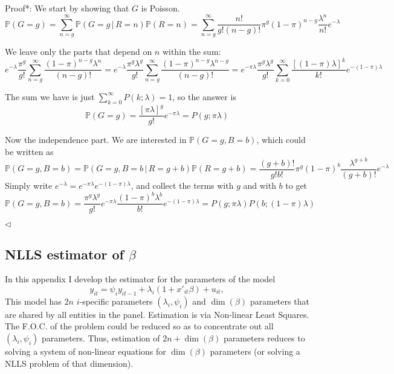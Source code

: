 \documentclass[12pt,pagebackref]{article}
\newcommand{\PP}[1]{\mathbb{P}\left(#1\right)}
\newcommand{\CP}[2]{\mathbb{P}\left(#1 \,| \, #2 \right)}
\begin{document}
\noindent *Proof*: We start by showing that \(G\) is Poisson. \[
\PP{G=g} = \sum_{n=g}^{\infty}\CP{G = g}{R=n}\PP{R = n} 
=
\sum_{n = g}^{\infty}
\frac{n!}{g!(n-g)!}
\pi^g (1-\pi)^{n-g}
\frac{\lambda^n}{n!} e^{-\lambda}
\]

\noindent We leave only the parts that depend on \(n\) within the sum:
\[
e^{-\lambda}\frac{\pi^g}{g!}\sum_{n = g}^{\infty}
\frac{(1-\pi)^{n-g} \lambda^n}{(n-g)!}
=
e^{-\lambda}\frac{\pi^g\lambda^g}{g!}\sum_{n = g}^{\infty}
\frac{(1-\pi)^{n-g} \lambda^{n-g} }{(n-g)!}
=
e^{-\pi\lambda}\frac{\pi^g\lambda^g}{g!}\sum_{k=0}^{\infty}
\frac{[(1-\pi)\lambda]^{k} }{k!}e^{-(1-\pi)\lambda}
\]

\noindent The sum we have is just
\(\sum_{k=0}^{\infty} P(k; \lambda) = 1\), so the answer is \[
\PP{G=g} = \frac{[\pi\lambda]^g}{g!}e^{-\pi\lambda} = P(g; \pi\lambda)
\]

Now the independence part. We are interested in \(\PP{G=g, B=b}\), which
could be written as \[\PP{G=g, B=b} = \CP{G=g, B=b}{R=g+b}\PP{R=g+b} = 
\frac{(g+b)!}{g!b!}
\pi^g (1-\pi)^b
\frac{\lambda^{g+b}}{(g+b)!} e^{-\lambda}
\] Simply write \(e^{-\lambda} = e^{-\pi\lambda}e^{-(1-\pi)\lambda}\),
and collect the terms with \(g\) and with \(b\) to get \[
\PP{G=g, B=b} = 
\frac{\pi^g \lambda^g}{g!}e^{-\pi\lambda}
\frac{(1-\pi)^b\lambda^b}{b!}e^{-(1-\pi)\lambda}
=
P(g; \pi \lambda) P(b; (1-\pi)\lambda)\]

\begin{flushright}
$\triangleleft$
\end{flushright}

\newpage

\hypertarget{nlls-estimator-of-beta}{%
\subsection{\texorpdfstring{NLLS estimator of
\(\beta\)}{NLLS estimator of \textbackslash{}beta}}\label{nlls-estimator-of-beta}}

In this appendix I develop the estimator for the parameters of the model
\begin{equation}\label{nonLinearLS}
 y_{it} = \psi_i y_{it-1} + \lambda_i(1+x'_{it}\beta) + u_{it},
\end{equation} This model has \(2n\) \(i\)-specific parameters
\((\lambda_i, \psi_i)\) and \(\dim(\beta)\) parameters that are shared
by all entities in the panel. Estimation is via Non-linear Least
Squares. The F.O.C. of the problem could be reduced so as to concentrate
out all \((\lambda_i,\psi_i)\) parameters. Thus, estimation of
\(2n + \dim(\beta)\) parameters reduces to solving a system of
non-linear equations for \(\dim(\beta)\) parameters (or solving a NLLS
problem of that dimension).
\end{document}
